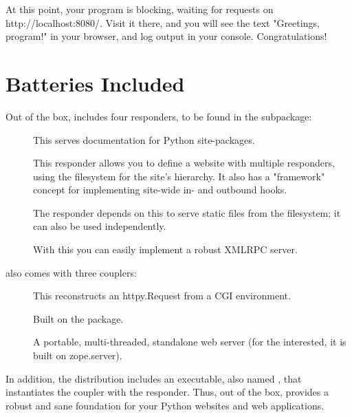 At this point, your program is blocking, waiting for requests on
http://localhost:8080/. Visit it there, and you will see the text "Greetings,
program!" in your browser, and log output in your console. Congratulations!


\section{Batteries Included}

Out of the box,  includes four responders, to be found in the
 subpackage:

\begin{description}

\item[]
    {This serves documentation for Python site-packages.}

\item[]
    {This responder allows you to define a website with multiple responders,
    using the filesystem for the site's hierarchy. It also has a "framework"
    concept for implementing site-wide in- and outbound hooks.}

\item[]
    {The  responder depends on this to serve static files from
    the filesystem; it can also be used independently.}

\item[]
    {With this you can easily implement a robust XMLRPC server.}

\end{description}


 also comes with three couplers:

\begin{description}

\item[]
    {This reconstructs an httpy.Request from a CGI environment.}

\item[]
    {Built on the  package.}

\item[]
    {A portable, multi-threaded, standalone web server (for the interested, it
    is built on zope.server).}

\end{description}


In addition, the  distribution includes an executable, also named
, that instantiates the  coupler with the
 responder. Thus, out of the box,  provides a
robust and sane foundation for your Python websites and web applications.


